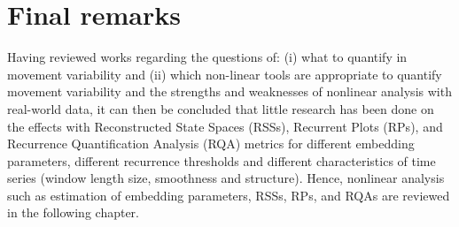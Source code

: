 \section{Final remarks}
Having reviewed works regarding the questions of: (i) what to quantify in 
movement variability and (ii) which non-linear tools are appropriate to quantify 
movement variability and the strengths and weaknesses of nonlinear analysis with 
real-world data, it can then be concluded that little research has been done 
on the effects with Reconstructed State Spaces (RSSs), Recurrent Plots (RPs), 
and Recurrence Quantification Analysis (RQA) metrics for different 
embedding parameters, different recurrence thresholds and different 
characteristics of time series (window length size, smoothness and structure).
Hence, nonlinear analysis such as estimation of embedding parameters, 
RSSs, RPs, and RQAs are reviewed in the following chapter.

